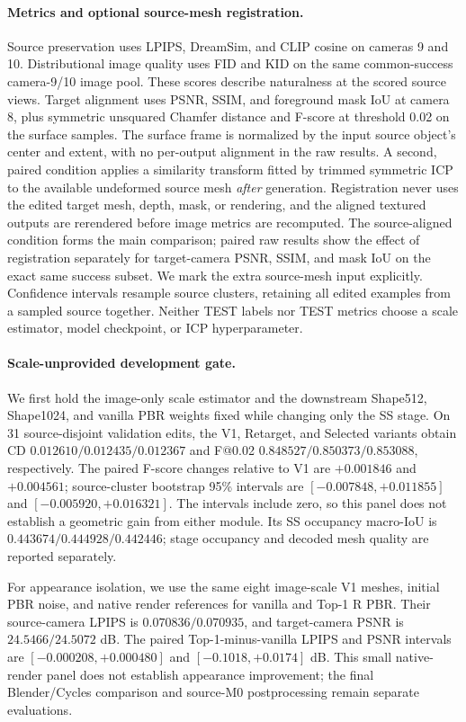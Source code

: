 \paragraph{Metrics and optional source-mesh registration.}
Source preservation uses LPIPS, DreamSim, and CLIP cosine on cameras 9 and 10.
Distributional image quality uses FID and KID on the same common-success
camera-9/10 image pool. These scores describe naturalness at the scored
source views.
Target alignment uses PSNR, SSIM, and foreground mask IoU at camera 8, plus
symmetric unsquared Chamfer distance and F-score at threshold 0.02 on the
surface samples. The surface frame is normalized by the input source object's
center and extent, with no per-output alignment in the raw results. A second,
paired condition applies a similarity transform fitted by trimmed symmetric ICP
to the available undeformed source mesh \emph{after} generation. Registration
never uses the edited target mesh, depth, mask, or rendering, and the aligned
textured outputs are rerendered before image metrics are recomputed. The
source-aligned condition forms the main comparison; paired raw results show
the effect of registration separately for target-camera PSNR, SSIM, and mask
IoU on the exact same success subset. We mark the extra source-mesh input
explicitly. Confidence intervals resample source clusters, retaining all
edited examples from a sampled source together. Neither TEST labels nor TEST
metrics choose a scale estimator, model checkpoint, or ICP hyperparameter.

\paragraph{Scale-unprovided development gate.}
We first hold the image-only scale estimator and the downstream Shape512,
Shape1024, and vanilla PBR weights fixed while changing only the SS stage.
On 31 source-disjoint validation edits, the V1, Retarget, and Selected
variants obtain CD $0.012610/0.012435/0.012367$ and F@0.02
$0.848527/0.850373/0.853088$, respectively. The paired F-score changes
relative to V1 are $+0.001846$ and $+0.004561$; source-cluster bootstrap
95\% intervals are $[-0.007848,+0.011855]$ and
$[-0.005920,+0.016321]$. The intervals include zero, so this panel does not
establish a geometric gain from either module. Its SS occupancy macro-IoU
is $0.443674/0.444928/0.442446$; stage occupancy and decoded mesh quality
are reported separately.

For appearance isolation, we use the same eight image-scale V1 meshes,
initial PBR noise, and native render references for vanilla and Top-1 R PBR.
Their source-camera LPIPS is $0.070836/0.070935$, and target-camera PSNR is
$24.5466/24.5072$ dB. The paired Top-1-minus-vanilla LPIPS and PSNR
intervals are $[-0.000208,+0.000480]$ and $[-0.1018,+0.0174]$ dB.
This small native-render panel does not establish appearance improvement;
the final Blender/Cycles comparison and source-M0 postprocessing remain
separate evaluations.
